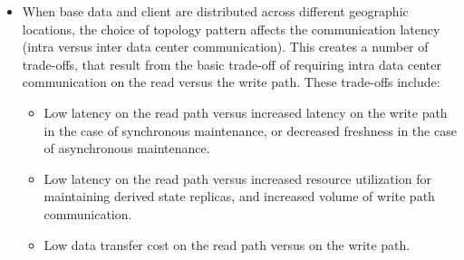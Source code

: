 \begin{itemize}
  \item When base data and client are distributed across different geographic locations,
  the choice of topology pattern affects the communication latency (intra versus inter data center communication).
  This creates a number of trade-offs, that result from the basic trade-off of requiring intra data center communication
  on the read versus the write path.
  These trade-offs include:
  \begin{itemize}
    \item Low latency on the read path versus increased latency on the write path in the case of synchronous maintenance,
    or decreased freshness in the case of asynchronous maintenance.
    \item Low latency on the read path versus increased resource utilization for maintaining derived state replicas,
    and increased volume of write path communication.
    \item Low data transfer cost on the read path versus on the write path.
  \end{itemize}

\end{itemize}


